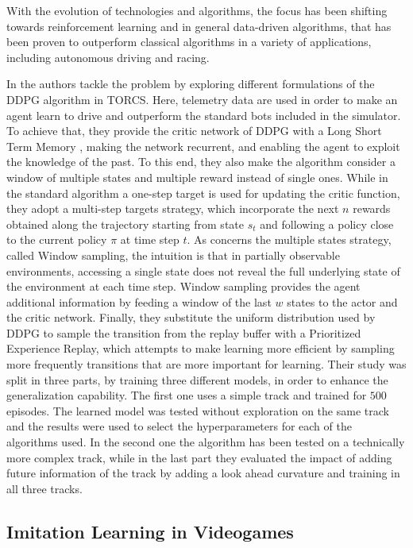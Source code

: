 With the evolution of technologies and algorithms, the focus has been shifting towards reinforcement learning and in general data-driven algorithms, that has been proven to outperform classical algorithms in a variety of applications, including autonomous driving and racing.

In \cite{formularl} the authors tackle the problem by exploring different formulations of the DDPG algorithm \cite{ddpg} in TORCS.
Here, telemetry data are used in order to make an agent learn to drive and outperform the standard bots included in the simulator.
To achieve that, they provide the critic network of DDPG with a Long Short Term Memory \cite{lstm}, making the network recurrent, and enabling the agent to exploit the knowledge of the past. To this end, they also make the algorithm consider a window of multiple states and multiple reward instead of single ones.
While in the standard algorithm a one-step target is used for updating the critic function, they adopt a multi-step targets strategy, which incorporate the next $n$ rewards obtained along the trajectory starting from state $s_t$ and following a policy close to the current policy \(\pi\) at time step $t$.
As concerns the multiple states strategy, called Window sampling, the intuition is that in partially observable environments, accessing a single state does not reveal the full underlying state of the environment at each time step. Window sampling provides the agent additional information by feeding a window of the last $w$ states to the actor and the critic network.
Finally, they substitute the uniform distribution used by DDPG to sample the transition from the replay buffer with a Prioritized Experience Replay, which attempts to make learning more efficient by sampling more frequently transitions that are more important for learning.
Their study was split in three parts, by training three different models, in order to enhance the generalization capability. The first one uses a simple track and trained for $500$ episodes. The learned model was tested without exploration on the same track and the results were used to select the hyperparameters for each of the algorithms used. In the second one the algorithm has been tested on a technically more complex track, while in the last part they evaluated the impact of adding future information of the track by adding a look ahead curvature and training in all three tracks.


\subsection{Imitation Learning in Videogames}


